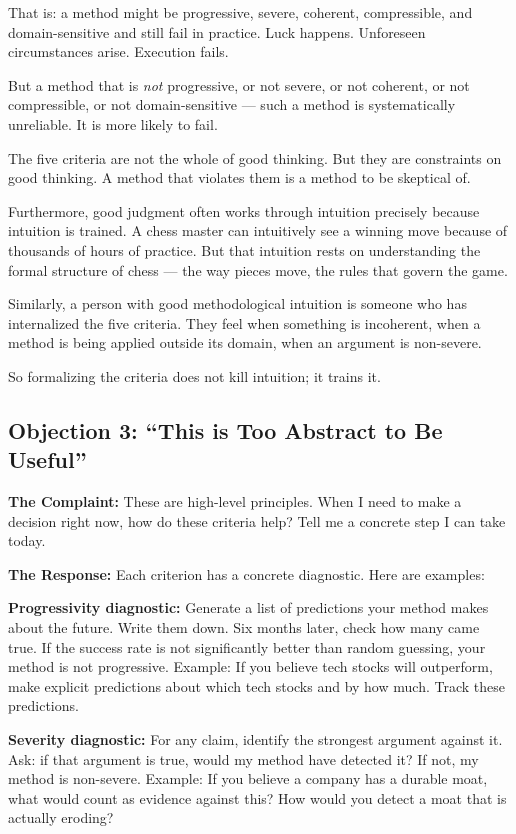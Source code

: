 \documentclass[11pt,letterpaper]{article}
\begin{document}
That is: a method might be progressive, severe, coherent, compressible, and domain-sensitive and still fail in practice. Luck happens. Unforeseen circumstances arise. Execution fails.

But a method that is \emph{not} progressive, or not severe, or not coherent, or not compressible, or not domain-sensitive — such a method is systematically unreliable. It is more likely to fail.

The five criteria are not the whole of good thinking. But they are constraints on good thinking. A method that violates them is a method to be skeptical of.

Furthermore, good judgment often works through intuition precisely because intuition is trained. A chess master can intuitively see a winning move because of thousands of hours of practice. But that intuition rests on understanding the formal structure of chess — the way pieces move, the rules that govern the game.

Similarly, a person with good methodological intuition is someone who has internalized the five criteria. They feel when something is incoherent, when a method is being applied outside its domain, when an argument is non-severe.

So formalizing the criteria does not kill intuition; it trains it.

\subsection*{Objection 3: ``This is Too Abstract to Be Useful''}

\textbf{The Complaint:} These are high-level principles. When I need to make a decision right now, how do these criteria help? Tell me a concrete step I can take today.

\textbf{The Response:} Each criterion has a concrete diagnostic. Here are examples:

\textbf{Progressivity diagnostic:} Generate a list of predictions your method makes about the future. Write them down. Six months later, check how many came true. If the success rate is not significantly better than random guessing, your method is not progressive. Example: If you believe tech stocks will outperform, make explicit predictions about which tech stocks and by how much. Track these predictions.

\textbf{Severity diagnostic:} For any claim, identify the strongest argument against it. Ask: if that argument is true, would my method have detected it? If not, my method is non-severe. Example: If you believe a company has a durable moat, what would count as evidence against this? How would you detect a moat that is actually eroding?
\end{document}
